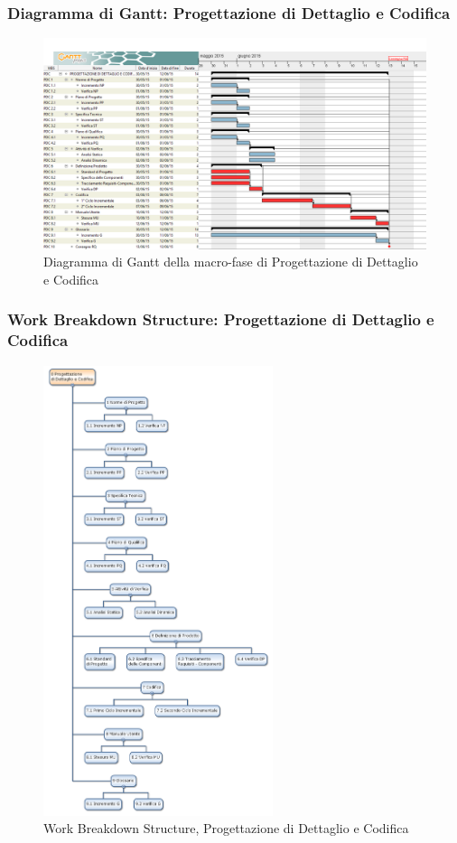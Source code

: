 \subsubsection{Diagramma di Gantt: Progettazione di Dettaglio e Codifica}
\begin{figure}[h] 
	\centering
	\includegraphics[width=\textwidth]{./img/progettazione_dettaglio.png}
	\caption{Diagramma di Gantt della macro-fase di Progettazione di Dettaglio e Codifica}
\end{figure}

\newpage
\subsubsection{Work Breakdown Structure: Progettazione di Dettaglio e Codifica}
\begin{figure}[h]
	\centering
	\includegraphics[width=0.6\textwidth]{./img/wbs_progettazione_dettaglio_codifica.png}
	\caption{Work Breakdown Structure, Progettazione di Dettaglio e Codifica}
\end{figure}

